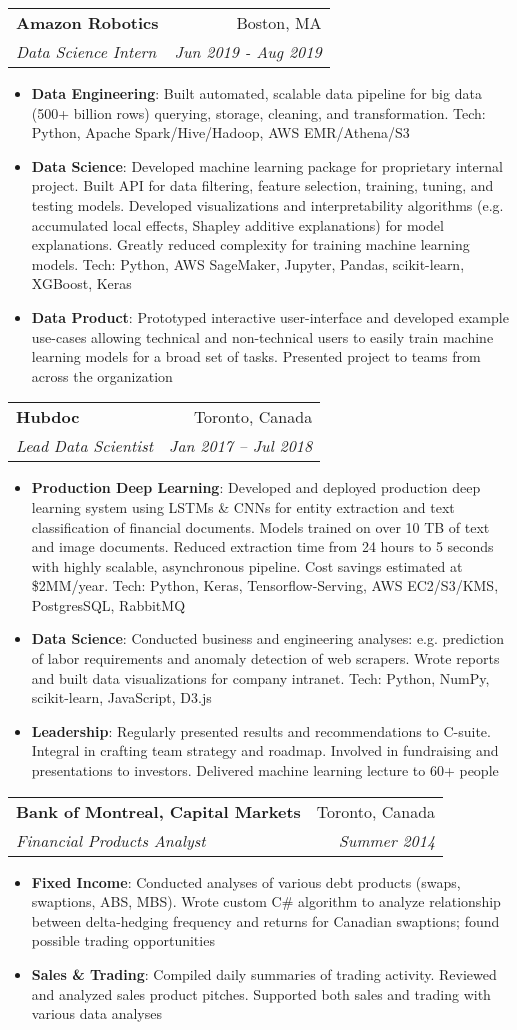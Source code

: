 \documentclass[letterpaper,11pt]{article}
\makeatletter
\newcommand{\resumeItem}[2]{
  \item\small{
    \textbf{#1}{: #2 \vspace{-2pt}}
  }
}
\newcommand{\resumeSubheading}[4]{
  \vspace{-1pt}\item
    \begin{tabular*}{0.97\textwidth}[t]{l@{\extracolsep{\fill}}r}
      \textbf{#1} & #2 \\
      \textit{\small#3} & \textit{\small #4} \\
    \end{tabular*}\vspace{-5pt}
}
\newcommand{\resumeItemListStart}{\begin{itemize}}
\newcommand{\resumeItemListEnd}{\end{itemize}\vspace{-5pt}}
\makeatother
\begin{document}
  \resumeSubheading
    {Amazon Robotics}{Boston, MA}
    {Data Science Intern}{Jun 2019 - Aug 2019}
    \resumeItemListStart
      \resumeItem{Data Engineering}
        {Built automated, scalable data pipeline for big data (500+ billion rows) querying, storage, cleaning,
        and transformation. Tech: Python, Apache Spark/Hive/Hadoop, AWS EMR/Athena/S3}
      \resumeItem{Data Science}
        {Developed machine learning package for proprietary internal project. Built API for data filtering,
        feature selection, training, tuning, and testing models. Developed visualizations and interpretability algorithms
        (e.g. accumulated local effects, Shapley additive explanations) for model explanations. Greatly reduced complexity
        for training machine learning models. Tech: Python, AWS SageMaker, Jupyter, Pandas, scikit-learn, XGBoost, Keras}
      \resumeItem{Data Product}
        {Prototyped interactive user-interface and developed example use-cases allowing technical and non-technical
        users to easily train machine learning models for a broad set of tasks. Presented project to teams from across
        the organization}
    \resumeItemListEnd

    \resumeSubheading
      {Hubdoc}{Toronto, Canada}
      {Lead Data Scientist}{Jan 2017 -- Jul 2018}
      \resumeItemListStart
        \resumeItem{Production Deep Learning}
          {Developed and deployed production deep learning system using LSTMs \& CNNs for entity extraction and
          text classification of financial documents. Models trained on over 10 TB of text and image documents.
          Reduced extraction time from 24 hours to 5 seconds with highly scalable, asynchronous pipeline. Cost savings
          estimated at \$2MM/year. Tech: Python, Keras, Tensorflow-Serving, AWS EC2/S3/KMS, PostgresSQL, RabbitMQ}
        \resumeItem{Data Science}
          {Conducted business and engineering analyses: e.g. prediction of labor requirements and anomaly detection of web
          scrapers. Wrote reports and built data visualizations for company intranet. Tech: Python, NumPy, scikit-learn,
          JavaScript, D3.js}
        \resumeItem{Leadership}
          {Regularly presented results and recommendations to C-suite. Integral in crafting team strategy and
          roadmap. Involved in fundraising and presentations to investors. Delivered machine learning lecture to 60+ people}
      \resumeItemListEnd

    \resumeSubheading
      {Bank of Montreal, Capital Markets}{Toronto, Canada}
      {Financial Products Analyst}{Summer 2014}
      \resumeItemListStart
        \resumeItem{Fixed Income}
          {Conducted analyses of various debt products (swaps, swaptions, ABS, MBS). Wrote custom C\# algorithm
          to analyze relationship between delta-hedging frequency and returns for Canadian swaptions;
          found possible trading opportunities}
        \resumeItem{Sales \& Trading}
          {Compiled daily summaries of trading activity. Reviewed and analyzed sales product pitches. Supported
          both sales and trading with various data analyses}
      \resumeItemListEnd
\end{document}

